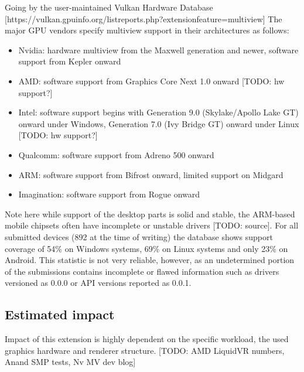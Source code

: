 Going by the user-maintained Vulkan Hardware Database [https://vulkan.gpuinfo.org/listreports.php?extensionfeature=multiview]
The major GPU vendors specify multiview support in their architectures as follows: 
\begin{itemize}
\item Nvidia: hardware multiview from the Maxwell generation and newer, software support from Kepler onward
\item AMD: software support from Graphics Core Next 1.0 onward [TODO: hw support?]
\item Intel: software support begins with Generation 9.0 (Skylake/Apollo Lake GT) onward under Windows, Generation 7.0 (Ivy Bridge GT) onward under Linux [TODO: hw support?]
\item Qualcomm: software support from Adreno 500 onward
\item ARM: software support from Bifrost onward, limited support on Midgard
\item Imagination: software support from Rogue onward
\end{itemize}
Note here while support of the desktop parts is solid and stable, the ARM-based mobile chipsets often have incomplete or unstable drivers [TODO: source]. 
For all submitted devices (892 at the time of writing) the database shows support coverage of 54\% on Windows systems, 69\% on Linux systems and only 23\% on Android. This statistic is not very reliable, however, as an undetermined portion of the submissions contains incomplete or flawed information such as drivers versioned as 0.0.0 or API versions reported as 0.0.1. 

\subsection{Estimated impact}
Impact of this extension is highly dependent on the specific workload, the used graphics hardware and renderer structure. 
[TODO: AMD LiquidVR numbers, Anand SMP tests, Nv MV dev blog]

